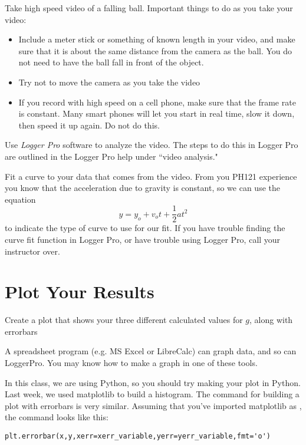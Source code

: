 \documentclass[twoside,11pt,ShortChapTitles]{BYUTextbook}
\begin{document}
Take high speed video of a falling ball. Important things to do as you take your video:
\begin{itemize}
\item Include a meter stick or something of known length in your video, and make sure that it is about the same distance from the camera as the ball.  You do not need to have the ball fall in front of the object.
\item Try not to move the camera as you take the video
\item If you record with high speed on a cell phone, make sure that the frame rate is constant.  Many smart phones will let you start in real time, slow it down, then speed it up again.  Do not do this.
\end{itemize}




Use \emph{Logger Pro} software to analyze the video. The steps to do this in Logger Pro are outlined in the Logger Pro help under
``video analysis."

Fit a curve to your data that comes from the video. From you PH121 experience
you know that the acceleration due to gravity is constant, so we can use the
equation
\[
y=y_{o}+v_{o}t+\frac{1}{2}at^{2}
\]
to indicate the type of curve to use for our fit. If you have trouble finding
the curve fit function in Logger Pro, or have trouble using Logger Pro, call
your instructor over.

\section{Plot Your Results}

Create a plot that shows your three different calculated values for $g$, along with errorbars

A spreadsheet program (e.g. MS Excel or LibreCalc) can graph data, and so can LoggerPro. You may know how to make a graph in one of these tools.

In this class, we are using Python, so you should try making your plot in Python.  Last week, we used matplotlib to build a histogram. The command for building a plot with errorbars is very similar.  Assuming that you've imported matplotlib as , the command looks like this:

\begin{Verbatim}
plt.errorbar(x,y,xerr=xerr_variable,yerr=yerr_variable,fmt='o')
\end{Verbatim}
\end{document}
